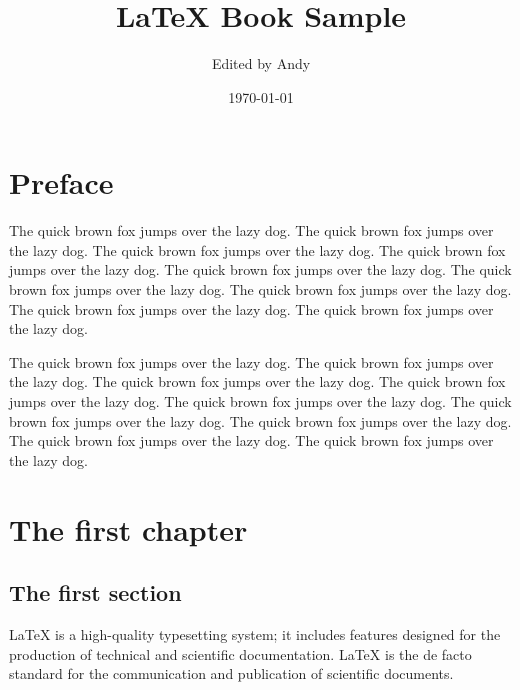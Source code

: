 \documentclass[openany,twoside,12pt]{book}
\title{\bfseries LaTeX Book Sample}
\author{Edited by Andy}
\date{\today}
\makeatletter
\renewcommand{\cleardoublepage}{\clearpage
  \clearpage\if@twoside\ifodd\c@page\else%
  \thispagestyle{empty}%
  \hbox{}\newpage\if@twocolumn\hbox{}\newpage\fi\fi\fi%
}
\theoremstyle{plain}
\numberwithin{equation}{chapter}
\numberwithin{figure}{chapter}
\numberwithin{table}{chapter}
\makeatother
\begin{document}
\maketitle

\thispagestyle{empty}


\frontmatter


\chapter*{Preface}

The quick brown fox jumps over the lazy dog. The quick brown fox jumps over the lazy dog. The quick brown fox jumps over the lazy dog. The quick brown fox jumps over the lazy dog. The quick brown fox jumps over the lazy dog. The quick brown fox jumps over the lazy dog. The quick brown fox jumps over the lazy dog. The quick brown fox jumps over the lazy dog. The quick brown fox jumps over the lazy dog.


The quick brown fox jumps over the lazy dog. The quick brown fox jumps over the lazy dog. The quick brown fox jumps over the lazy dog. The quick brown fox jumps over the lazy dog. The quick brown fox jumps over the lazy dog. The quick brown fox jumps over the lazy dog. The quick brown fox jumps over the lazy dog. The quick brown fox jumps over the lazy dog. The quick brown fox jumps over the lazy dog.


\cleardoublepage
{}
{}
\tableofcontents


\mainmatter



\chapter{The first chapter}

\section{The first section}\label{sec:firstsec}
LaTeX is a high-quality typesetting system; it includes features designed for the production of technical and scientific documentation. LaTeX is the de facto standard for the communication and publication of scientific documents.
\end{document}
